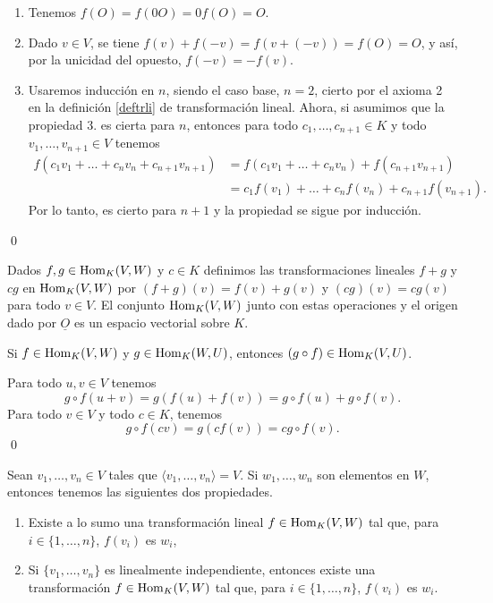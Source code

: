 \dem 
\begin{enumerate}
\item Tenemos $f(O)=f(0O)=0f(O)=O$.
\item Dado $v\in V$, se tiene $f(v)+f(-v)=f\left(v+(-v)\right)=f(O)=O$, y as\'i, por la unicidad del opuesto, $f(-v)=-f(v)$.
\item Usaremos inducci\'on en $n$, siendo el caso base, $n=2$, cierto por el axioma 2 en la definici\'on \ref{deftrli} de transformaci\'on lineal. Ahora, si asumimos que la propiedad 3. es cierta para $n$, entonces para todo $c_1,\ldots,c_{n+1}\in K$ y todo $v_1,\ldots,v_{n+1}\in V$ tenemos
\begin{align*}
f(c_1v_1+\ldots+c_nv_n+c_{n+1}v_{n+1})& = f(c_1v_1+\ldots+c_nv_n)+f(c_{n+1}v_{n+1})\\
  & = c_1f(v_1)+\ldots+c_nf(v_n)+c_{n+1}f(v_{n+1}).
\end{align*}
Por lo tanto, es cierto para $n+1$ y la propiedad se sigue por inducci\'on.
\end{enumerate}\qed

\begin{obs}
Dados $f,g\in\operatorname{Hom}_K(V,W)$ y $c\in K$ definimos las transformaciones lineales $f+g$ y $cg$ en $\operatorname{Hom}_K(V,W)$ por $(f+g)(v)=f(v)+g(v)$ y $(cg)(v) = cg(v)$ para todo $v\in V$. El conjunto $\operatorname{Hom}_K(V,W)$ junto con estas operaciones y el origen dado por $\underline{O}$ es un espacio vectorial sobre $K$.
\end{obs}

\begin{prop}\label{compeslineal}
Si $f\in\operatorname{Hom}_K(V,W)$ y $g\in\operatorname{Hom}_K(W,U)$, entonces $(g\circ f)\in\operatorname{Hom}_K(V,U)$.
\end{prop}

\dem Para todo $u,v\in V$ tenemos
\[
g\circ f(u+v)=g\left( f(u)+f(v)\right)= g\circ f(u)+g\circ f(v).
\]
Para todo $v\in V$ y todo $c\in K$, tenemos
\[
g\circ f(cv)=g\left( c f(v)\right)=cg\circ f(v).
\]
\qed

\begin{prop}\label{unitrlin}
Sean $v_1,\ldots,v_n\in V$ tales que $\langle v_1,\ldots,v_n\rangle=V$. Si $w_1,\ldots,w_n$ son elementos en $W$, entonces tenemos las siguientes dos propiedades.
\begin{enumerate}
\item Existe a lo sumo una transformaci\'on lineal $f\in\operatorname{Hom}_K(V,W)$ tal que, para $i\in\{1,\ldots,n\}$, $f(v_i)$ es $w_i$, 
\item Si $\{v_1,\ldots,v_n\}$ es linealmente independiente, entonces existe una transformaci\'on $f\in\operatorname{Hom}_K(V,W)$ tal que, para $i\in\{1,\ldots,n\}$, $f(v_i)$ es $w_i$.
\end{enumerate}
\end{prop}

